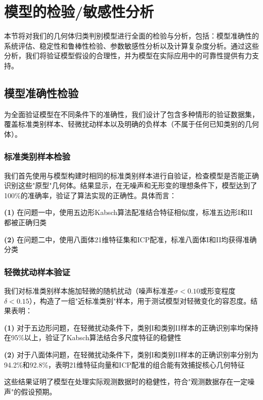 \section{模型的检验/敏感性分析}

本节将对我们的几何体归类判别模型进行全面的检验与分析，包括：模型准确性的系统评估、稳定性和鲁棒性检验、参数敏感性分析以及计算复杂度分析。通过这些分析，我们将验证模型假设的合理性，并为模型在实际应用中的可靠性提供有力支持。

\subsection{模型准确性检验}

为全面验证模型在不同条件下的准确性，我们设计了包含多种情形的验证数据集，覆盖标准类别样本、轻微扰动样本以及明确的负样本（不属于任何已知类别的几何体）。

\subsubsection{标准类别样本检验}

我们首先使用与模型构建时相同的标准类别样本进行自验证，检查模型是否能正确识别这些"原型"几何体。结果显示，在无噪声和无形变的理想条件下，模型达到了100\%的准确率，验证了算法实现的正确性。具体而言：

\textbf{(1)} 在问题一中，使用五边形Kabsch算法配准结合特征相似度，标准五边形I和II都被正确归类

\textbf{(2)} 在问题二中，使用八面体21维特征集和ICP配准，标准八面体I和II均获得准确分类

\subsubsection{轻微扰动样本验证}

我们对标准类别样本施加轻微的随机扰动（噪声标准差$\sigma < 0.10$或形变程度$\delta < 0.15$），构造了一组"近标准类别"样本，用于测试模型对轻微变化的容忍度。结果表明：

\textbf{(1)} 对于五边形问题，在轻微扰动条件下，类别I和类别II样本的正确识别率均保持在95\%以上，验证了Kabsch算法结合多尺度特征的稳健性

\textbf{(2)} 对于八面体问题，在轻微扰动条件下，类别I和类别II样本的正确识别率分别为94.2\%和92.8\%，表明21维特征向量和ICP配准的组合能有效捕捉核心几何特征

这些结果证明了模型在处理实际观测数据时的稳健性，符合"观测数据存在一定噪声"的假设预期。

